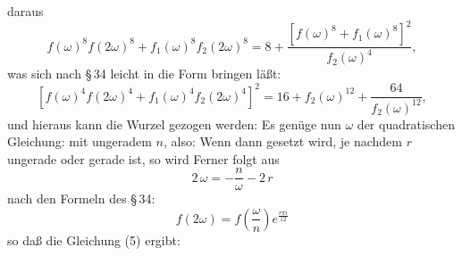 daraus
\[
f(\omega)^8f(2\omega)^8+f_1(\omega)^8f_2(2\omega)^8=8+\frac{[f(\omega)^8+f_1(\omega)^8]^2}{f_2(\omega)^4},
\]
was sich nach \S\,34 leicht in die Form bringen läßt:
\[
[f(\omega)^4f(2\omega)^4+f_1(\omega)^4f_2(2\omega)^4]^2=16+f_2(\omega)^{12}+\frac{64}{f_2(\omega)^{12}},
\]
und hieraus kann die Wurzel gezogen werden:
Es genüge nun $\omega$ der quadratischen Gleichung:
mit ungeradem $n$, also:
Wenn dann
gesetzt wird, je nachdem $r$ ungerade oder gerade ist, so wird
Ferner folgt aus
\[
2\,\omega=-\frac{n}{\omega}-2\,r
\]
nach den Formeln des \S\,34:
\[
f(2\omega)=f\!\left(\frac{\omega}{n}\right)e^{\frac{r\pi i}{12}}
\]
so daß die Gleichung (5) ergibt:
